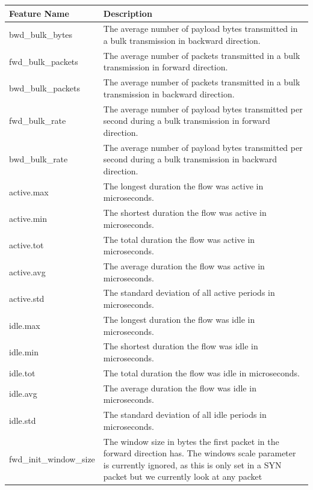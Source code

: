 \documentclass[11pt]{article}
\begin{document}
\begin{table}
  \centering
  \begin{tabular}{|l|p{12cm}|}
    \hline
    Feature Name & Description \\
    \hline\hline
    bwd\_bulk\_bytes & The average number of payload bytes transmitted in a bulk transmission in backward direction. \\
    \hline
    fwd\_bulk\_packets & The average number of packets transmitted in a bulk transmission in forward direction. \\
    \hline
    bwd\_bulk\_packets & The average number of packets transmitted in a bulk transmission in backward direction. \\
    \hline
    fwd\_bulk\_rate & The average number of payload bytes transmitted per second during a bulk transmission in forward direction. \\
    \hline
    bwd\_bulk\_rate & The average number of payload bytes transmitted per second during a bulk transmission in backward direction. \\
    \hline
    active.max & The longest duration the flow was active in microseconds. \\
    \hline
    active.min & The shortest duration the flow was active in microseconds. \\
    \hline
    active.tot & The total duration the flow was active in microseconds. \\
    \hline
    active.avg & The average duration the flow was active in microseconds. \\
    \hline
    active.std & The standard deviation of all active periods in microseconds. \\
    \hline
    idle.max & The longest duration the flow was idle in microseconds. \\
    \hline
    idle.min & The shortest duration the flow was idle in microseconds. \\
    \hline
    idle.tot & The total duration the flow was idle in microseconds. \\
    \hline
    idle.avg & The average duration the flow was idle in microseconds. \\
    \hline
    idle.std & The standard deviation of all idle periods in microseconds. \\
    \hline
    fwd\_init\_window\_size & The window size in bytes the first packet in the forward direction has. The windows scale parameter is currently ignored, as this is only set in a SYN packet but we currently look at any packet \\

\end{tabular}
\end{table}
\end{document}

